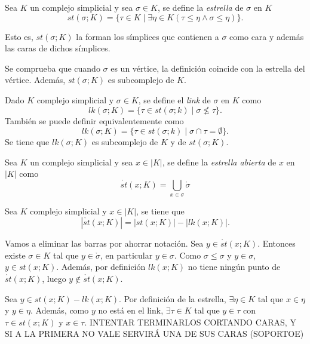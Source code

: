 \documentclass[HS.tex]{subfiles}
\begin{document}
\begin{defi}
Sea $K$ un complejo simplicial y sea $\sigma\in K$, se define la \emph{estrella} de $\sigma$ en $K$
\[
st(\sigma;K)=\{\tau\in K\mid \exists\eta\in K (\tau\leq\eta\land \sigma\leq\eta)\}.
\]

Esto es, $st(\sigma;K)$ la forman los símplices que contienen a $\sigma$ como cara y además las caras de dichos símplices.
\end{defi}

\begin{nota}
Se comprueba que cuando $\sigma$ es un vértice, la definición coincide con la estrella del vértice. Además, $st(\sigma;K)$ es subcomplejo de $K$. 
\end{nota}

\begin{defi}
Dado $K$ complejo simplicial y $\sigma\in K$, se define el \emph{link} de $\sigma$ en $K$ como
\[
lk(\sigma;K)=\{\tau\in st(\sigma;k)\mid \sigma\not\leq \tau\}.
\]
También se puede definir equivalentemente como 
\[
lk(\sigma;K)=\{\tau\in st(\sigma;k)\mid \sigma\cap \tau=\emptyset\}.
\]
Se tiene que $lk(\sigma;K)$ es subcomplejo de $K$ y de $st(\sigma;K)$.
\end{defi}

\begin{defi}
Sea $K$ un complejo simplicial y sea $x\in|K|$, se define la \emph{estrella abierta} de $x$ en $|K|$ como
\[
\mathring{st}(x;K)=\bigcup_{x\in\sigma}\mathring{\sigma}
\]
\end{defi}

\begin{prop}
Sea $K$ complejo simplicial y $x\in|K|$, se tiene que
\[
|\mathring{st}(x;K)|=|st(x;K)|-|lk(x;K)|.
\]
\end{prop}
\begin{dem}
Vamos a eliminar las barras por ahorrar notación. Sea $y\in \mathring{st}(x;K)$. Entonces existe $\sigma\in K$ tal que $y\in\mathring{\sigma}$, en particular $y\in\sigma$. Como $\sigma\leq\sigma$ y $y\in\sigma$, $y\in st(x;K)$. Además, por definición $lk(x;K)$ no tiene ningún punto de $\mathring{st}(x;K)$, luego $y\notin\mathring{st}(x;K)$.

Sea $y\in st(x;K)-lk(x;K)$. Por definición de la estrella, $\exists\eta\in K$ tal que $x\in\eta$ y $y\in\eta$. Además, como $y$ no está en el link, $\exists \tau\in K$ tal que $y\in\tau$ con $\tau\in st(x;K)$ y $x\in\tau$. INTENTAR TERMINARLOS CORTANDO CARAS, Y SI A LA PRIMERA NO VALE SERVIRÁ UNA DE SUS CARAS (SOPORTOE)  \QED
\end{dem}
\end{document}
